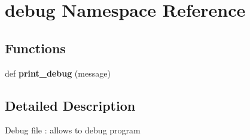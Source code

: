 \hypertarget{namespacedebug}{}\section{debug Namespace Reference}
\label{namespacedebug}
\subsection*{Functions}
\begin{DoxyCompactItemize}
\item 
def {\bfseries print\+\_\+debug} (message)\hypertarget{namespacedebug_a5d3ca0fb228c0beccac40152e6fbc0bb}{}\label{namespacedebug_a5d3ca0fb228c0beccac40152e6fbc0bb}

\end{DoxyCompactItemize}


\subsection{Detailed Description}
\begin{DoxyVerb}Debug file : allows to debug program\end{DoxyVerb}
 
